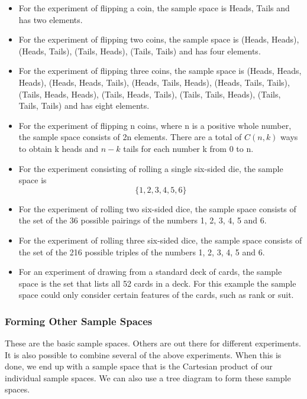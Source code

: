 \documentclass[12pt]{article}
\begin{document}
\begin{itemize}
\item For the experiment of flipping a coin, the sample space is {Heads, Tails} and has two elements.

\item For the experiment of flipping two coins, the sample space is {(Heads, Heads), (Heads, Tails), (Tails, Heads), (Tails, Tails) } and has four elements.

\item For the experiment of flipping three coins, the sample space is {(Heads, Heads, Heads), (Heads, Heads, Tails), (Heads, Tails, Heads), (Heads, Tails, Tails), (Tails, Heads, Heads), (Tails, Heads, Tails), (Tails, Tails, Heads), (Tails, Tails, Tails) } and has eight elements.

\item For the experiment of flipping n coins, where n is a positive whole number, the sample space consists of 2n elements. There are a total of $C(n, k)$ ways to obtain k heads and $n - k$ tails for each number k from 0 to n.

\item For the experiment consisting of rolling a single six-sided die, the sample space is 
\[\{1, 2, 3, 4, 5, 6\} \]
\item For the experiment of rolling two six-sided dice, the sample space consists of the set of the 36 possible pairings of the numbers 1, 2, 3, 4, 5 and 6.
\item For the experiment of rolling three six-sided dice, the sample space consists of the set of the 216 possible triples of the numbers 1, 2, 3, 4, 5 and 6.
\item For an experiment of drawing from a standard deck of cards, the sample space is the set that lists all 52 cards in a deck. For this example the sample space could only consider certain features of the cards, such as rank or suit.
\end{itemize}

\subsubsection{Forming Other Sample Spaces}

These are the basic sample spaces. Others are out there for different experiments. It is also possible to combine several of the above experiments. When this is done, we end up with a sample space that is the Cartesian product of our individual sample spaces. We can also use a tree diagram to form these sample spaces.
\end{document}

